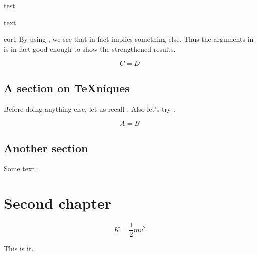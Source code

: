 \documentclass[amssymb,amsfonts]{wwwnotes2}
\begin{document}
\begin{rmk}
	\lipsum[27]

	test
\end{rmk}

\begin{cor}
	\lipsum[24]

	text
\end{cor}

\begin{pfof}{cor1}
	By using , we see that  in fact implies something else. Thus the arguments in  is in fact good enough to show the strengthened results. 
\end{pfof}

\begin{equation}
	C = D
\end{equation}

\section{A section on \TeX{}niques}

Before doing anything else, let us recall . Also let's try .

\lipsum[2]

\begin{equation}
	A = B
\end{equation}

\lipsum[3-8]



\section{Another section}

\lipsum[5-9]

Some text \cite{Wong2009}.


\chapter{Second chapter}


\lipsum[10-23]

\begin{equation}
K = \frac12 mv^2
\end{equation}

This is it.




\end{document}
